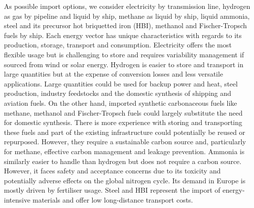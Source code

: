 
As possible import options, we consider electricity by transmission line,
hydrogen as gas by pipeline and liquid by ship, methane as liquid by ship,
liquid ammonia, steel and its precursor hot briquetted iron (HBI), methanol and
Fischer-Tropsch fuels by ship. Each energy vector has unique characteristics
with regards to its production, storage, transport and consumption. Electricity offers
the most flexible usage but is challenging to store and requires variability
management if sourced from wind or solar energy. Hydrogen is easier to store and
transport in large quantities but at the expense of conversion losses and less
versatile applications. Large quantities could be used for backup power and
heat, steel production, industry feedstocks and the domestic synthesis of
shipping and aviation fuels. On the other hand, imported synthetic carbonaceous
fuels like methane, methanol and Fischer-Tropsch fuels could largely substitute
the need for domestic synthesis. There is more experience with storing and
transporting these fuels and part of the existing infrastructure could
potentially be reused or repurposed. However, they require a sustainable carbon
source and, particularly for methane, effective carbon management and leakage
prevention.\cite{shirizadehImpactMethaneLeakage2023} Ammonia is similarly easier
to handle than hydrogen but does not require a carbon source. However, it faces
safety and acceptance concerns due to its toxicity and potentially adverse
effects on the global nitrogen
cycle.\cite{bertagniMinimizingImpactsAmmonia2023,wolframUsingAmmoniaShipping2022}
Its demand in Europe is mostly driven by fertiliser usage. Steel and HBI
represent the import of energy-intensive materials and offer low long-distance
transport costs.


